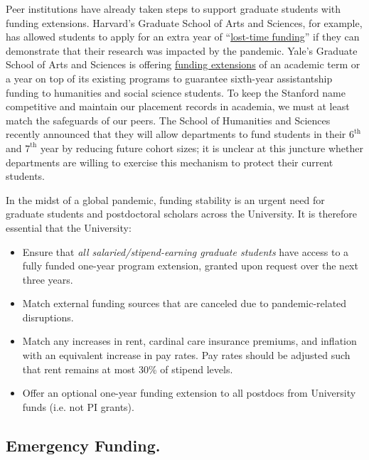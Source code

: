 \documentclass[12pt, titlepage, letterpaper]{article}
\begin{document}
Peer institutions have already taken steps to support graduate students with funding extensions. Harvard’s Graduate School of Arts and Sciences, for example, has allowed students to apply for an extra year of “\href{https://gsas.harvard.edu/news/stories/gsas-emergency-support-initiative}{lost-time funding}” if they can demonstrate that their research was impacted by the pandemic. Yale’s Graduate School of Arts and Sciences is offering \href{https://gsas.yale.edu/news/deans-message-about-funding-extensions-students}{funding extensions} of an academic term or a year on top of its existing programs to guarantee sixth-year assistantship funding to humanities and social science students. To keep the Stanford name competitive and maintain our placement records in academia, we must at least match the safeguards of our peers. The School of Humanities and Sciences recently announced that they will allow departments to fund students in their $6^{\mathrm{th}}$ and $7^{\mathrm{th}}$ year by reducing future cohort sizes; it is unclear at this juncture whether departments are willing to exercise this mechanism to protect their current students. 

In the midst of a global pandemic, funding stability is an urgent need for graduate students and postdoctoral scholars across the University. It is therefore essential that the University:  

\begin{itemize}
    \item Ensure that \textit{all salaried/stipend-earning graduate students} have access to a fully funded one-year program extension, granted upon request over the next three years.
    \item Match external funding sources that are canceled due to pandemic-related disruptions.
    \item Match any increases in rent, cardinal care insurance premiums, and inflation with an equivalent increase in pay rates. Pay rates should be adjusted such that rent remains at most 30\% of stipend levels.
    \item Offer an optional one-year funding extension to all postdocs from University funds (i.e. not PI grants).
\end{itemize}

\subsection*{Emergency Funding.}
%
\end{document}
